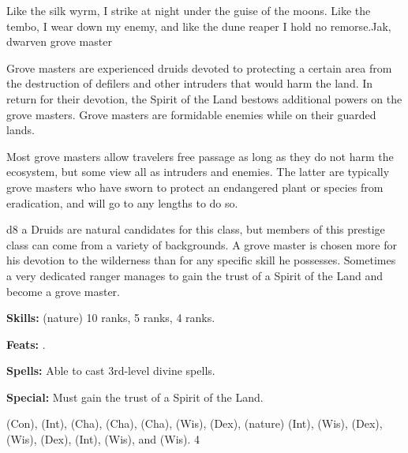 {Like the silk wyrm, I strike at night under the guise of the moons. Like the tembo, I wear down my enemy, and like the dune reaper I hold no remorse.}{Jak, dwarven grove master}
{Grove masters are experienced druids devoted to protecting a certain area from the destruction of defilers and other intruders that would harm the land. In return for their devotion, the Spirit of the Land bestows additional powers on the grove masters. Grove masters are formidable enemies while on their guarded lands.

Most grove masters allow travelers free passage as long as they do not harm the ecosystem, but some view all as intruders and enemies. The latter are typically grove masters who have sworn to protect an endangered plant or species from eradication, and will go to any lengths to do so.}
{d8}
{a}
{Druids are natural candidates for this class, but members of this prestige class can come from a variety of backgrounds. A grove master is chosen more for his devotion to the wilderness than for any specific skill he possesses. Sometimes a very dedicated ranger manages to gain the trust of a Spirit of the Land and become a grove master.}
{
\textbf{Skills:}  (nature) 10 ranks,  5 ranks,  4 ranks.

\textbf{Feats:} .

\textbf{Spells:} Able to cast 3rd-level divine spells.

\textbf{Special:} Must gain the trust of a Spirit of the Land.
}
{ (Con),  (Int),  (Cha),  (Cha),  (Cha),  (Wis),  (Dex),  (nature) (Int),  (Wis),  (Dex),  (Wis),  (Dex),  (Int),  (Wis), and  (Wis).
}
{4}
